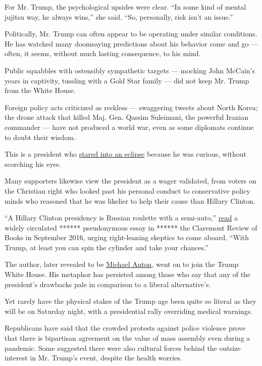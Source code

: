 For Mr. Trump, the psychological upsides were clear. ``In some kind of
mental jujitsu way, he always wins,'' she said. ``So, personally, risk
isn't an issue.''

Politically, Mr. Trump can often appear to be operating under similar
conditions. He has watched many doomsaying predictions about his
behavior come and go --- often, it seems, without much lasting
consequence, to his mind.

Public squabbles with ostensibly sympathetic targets --- mocking John
McCain's years in captivity, tussling with a Gold Star family --- did
not keep Mr. Trump from the White House.

Foreign policy acts criticized as reckless --- swaggering tweets about
North Korea; the drone attack that killed Maj. Gen. Qassim Suleimani,
the powerful Iranian commander --- have not produced a world war, even
as some diplomats continue to doubt their wisdom.

This is a president who
\href{https://www.nytimes.com/2017/08/21/us/politics/trump-eclipse.html}{stared
into an eclipse} because he was curious, without scorching his eyes.

Many supporters likewise view the president as a wager validated, from
voters on the Christian right who looked past his personal conduct to
conservative policy minds who reasoned that he was likelier to help
their cause than Hillary Clinton.

``A Hillary Clinton presidency is Russian roulette with a semi-auto,''
\href{https://claremontreviewofbooks.com/digital/the-flight-93-election/}{read}
a widely circulated ****** pseudonymous essay in ****** the Claremont
Review of Books in September 2016, urging right-leaning skeptics to come
aboard. ``With Trump, at least you can spin the cylinder and take your
chances.''

The author, later revealed to be
\href{https://www.nytimes.com/2018/04/24/us/politics/michael-anton-white-house-state-dinner.html}{Michael
Anton}, went on to join the Trump White House. His metaphor has
persisted among those who say that any of the president's drawbacks pale
in comparison to a liberal alternative's.

Yet rarely have the physical stakes of the Trump age been quite so
literal as they will be on Saturday night, with a presidential rally
overriding medical warnings.

Republicans have said that the crowded protests against police violence
prove that there is bipartisan agreement on the value of mass assembly
even during a pandemic. Some suggested there were also cultural forces
behind the outsize interest in Mr. Trump's event, despite the health
worries.


